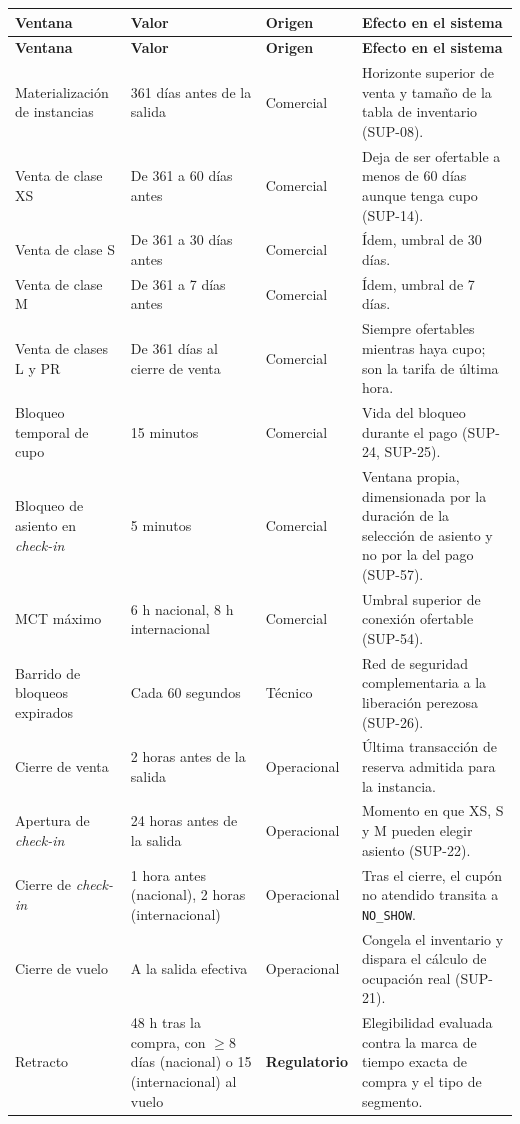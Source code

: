 \documentclass[10pt,letterpaper]{article}
\begin{document}
\begin{longtable}{@{}L{4.4cm} L{3.4cm} L{2.0cm} L{5.6cm}@{}}
\toprule \textbf{Ventana} & \textbf{Valor} & \textbf{Origen} & \textbf{Efecto en el sistema} \\ \midrule \endfirsthead
\toprule \textbf{Ventana} & \textbf{Valor} & \textbf{Origen} & \textbf{Efecto en el sistema} \\ \midrule \endhead
Materialización de instancias & 361 días antes de la salida & Comercial & Horizonte superior de venta y tamaño de la tabla de inventario (SUP-08). \\
Venta de clase XS & De 361 a 60 días antes & Comercial & Deja de ser ofertable a menos de 60 días aunque tenga cupo (SUP-14). \\
Venta de clase S & De 361 a 30 días antes & Comercial & Ídem, umbral de 30 días. \\
Venta de clase M & De 361 a 7 días antes & Comercial & Ídem, umbral de 7 días. \\
Venta de clases L y PR & De 361 días al cierre de venta & Comercial & Siempre ofertables mientras haya cupo; son la tarifa de última hora. \\
Bloqueo temporal de cupo & 15 minutos & Comercial & Vida del bloqueo durante el pago (SUP-24, SUP-25). \\
Bloqueo de asiento en \emph{check-in} & 5 minutos & Comercial & Ventana propia, dimensionada por la duración de la selección de asiento y no por la del pago (SUP-57). \\
MCT máximo & 6 h nacional, 8 h internacional & Comercial & Umbral superior de conexión ofertable (SUP-54). \\
Barrido de bloqueos expirados & Cada 60 segundos & Técnico & Red de seguridad complementaria a la liberación perezosa (SUP-26). \\
Cierre de venta & 2 horas antes de la salida & Operacional & Última transacción de reserva admitida para la instancia. \\
Apertura de \emph{check-in} & 24 horas antes de la salida & Operacional & Momento en que XS, S y M pueden elegir asiento (SUP-22). \\
Cierre de \emph{check-in} & 1 hora antes (nacional), 2 horas (internacional) & Operacional & Tras el cierre, el cupón no atendido transita a \texttt{NO\_SHOW}. \\
Cierre de vuelo & A la salida efectiva & Operacional & Congela el inventario y dispara el cálculo de ocupación real (SUP-21). \\
Retracto & 48 h tras la compra, con $\ge 8$ días (nacional) o 15 (internacional) al vuelo & \textbf{Regulatorio} & Elegibilidad evaluada contra la marca de tiempo exacta de compra y el tipo de segmento. \\

\end{longtable}
\end{document}
